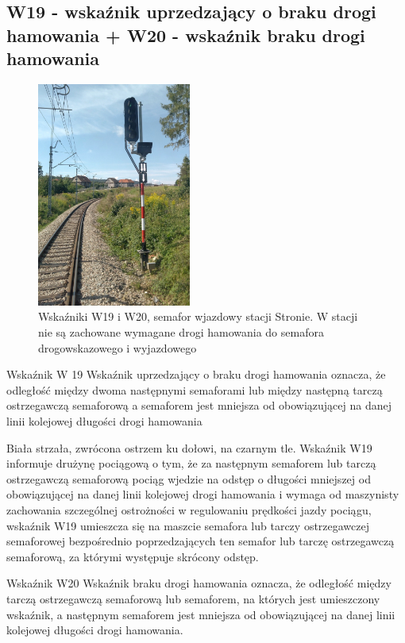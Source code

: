 \subsection{W19 - wskaźnik uprzedzający o braku drogi hamowania + W20 - wskaźnik braku drogi hamowania}
	\begin{figure}
	\includegraphics[width=0.45\textwidth]{skryptkierownik-img/w19.jpg}
	\caption{Wskaźniki W19 i W20, semafor wjazdowy stacji Stronie. W stacji nie są zachowane wymagane drogi hamowania do semafora drogowskazowego i wyjazdowego}
\end{figure}
Wskaźnik W 19 {\textquotedbl}Wskaźnik uprzedzający o braku drogi hamowania{\textquotedbl} oznacza, że odległość między dwoma następnymi semaforami lub między następną tarczą ostrzegawczą semaforową a semaforem jest mniejsza od obowiązującej na danej linii kolejowej długości drogi hamowania 

Biała strzała, zwrócona ostrzem ku dołowi, na czarnym tle. Wskaźnik W19 informuje drużynę pociągową o tym, że za następnym semaforem lub tarczą ostrzegawczą semaforową pociąg wjedzie na odstęp o długości mniejszej od obowiązującej na danej linii kolejowej drogi hamowania i wymaga od maszynisty zachowania szczególnej ostrożności w regulowaniu
prędkości jazdy pociągu, wskaźnik W19 umieszcza się na maszcie semafora lub tarczy ostrzegawczej semaforowej bezpośrednio poprzedzających ten semafor lub tarczę ostrzegawczą semaforową, za którymi występuje skrócony odstęp. 

Wskaźnik W20 {\textquotedbl}Wskaźnik braku drogi hamowania{\textquotedbl} oznacza, że odległość między tarczą ostrzegawczą semaforową lub semaforem, na których jest umieszczony wskaźnik, a następnym semaforem jest mniejsza od obowiązującej na danej linii kolejowej długości drogi hamowania. 

